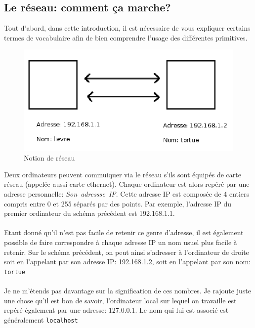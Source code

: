 \subsection{Le réseau: comment ça marche?}
Tout d'abord, dans cette introduction, il est nécessaire de vous expliquer certains termes de vocabulaire afin de bien comprendre l'usage des différentes primitives.
\begin{figure}[h]
\includegraphics{images/reseau.png}
\caption{Notion de réseau}
\end{figure}
Deux ordinateurs peuvent commuiquer via le réseau s'ils sont équipés de carte réseau (appelée aussi carte ethernet). Chaque ordinateur est alors repéré par une adresse personnelle: \textit{Son~adressse~IP}. Cette adresse IP est composée de 4 entiers compris entre 0 et 255 séparés par des points. Par exemple, l'adresse IP du premier ordinateur du schéma précédent est 192.168.1.1.\\ \\
Etant donné qu'il n'est pas facile de retenir ce genre d'adresse, il est également possible de faire correspondre à chaque adresse IP un nom usuel plus facile à retenir. Sur le schéma précédent, on peut ainsi s'adresser à l'ordinateur de droite soit en l'appelant par son adresse IP: 192.168.1.2, soit en l'appelant par son nom: \texttt{tortue}\\ \\
Je ne m'étends pas davantage sur la signification de ces nombres. Je rajoute juste une chose qu'il est bon de savoir, l'ordinateur local sur lequel on travaille est repéré également par une adresse: 127.0.0.1. Le nom qui lui est associé est généralement \texttt{localhost} 
